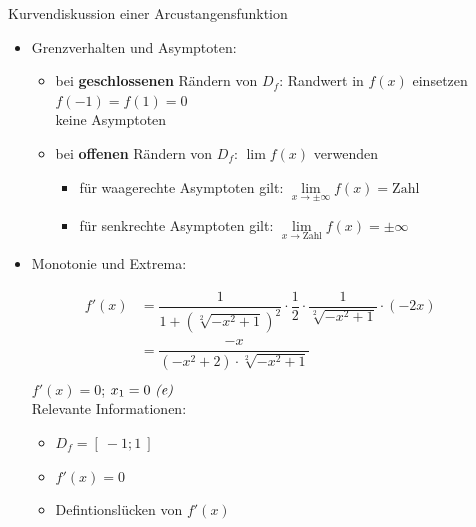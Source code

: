 \begin{Example}{Kurvendiskussion einer Arcustangensfunktion}{}
\begin{itemize}
{\begin{itemize}
{                $x_{1} = -1 \ \text{\textit{(e)}}; \quad x_{2} = 1 \ \text{\textit{(e)}}$
                }
        \end{itemize}
        }
    \item Grenzverhalten und Asymptoten: \\[-3.0ex]{
        \begin{itemize}
            \item bei \textbf{geschlossenen} Rändern von $D_{f}$: \quad Randwert in  $f(x)$ einsetzen \\[1.0ex]{
                $f(-1) = f(1) = 0$\\[1.0ex]
                keine Asymptoten
                }
            \item bei \textbf{offenen} Rändern von $D_{f}$: \quad $\lim\limits f(x)$ verwenden \\[-2.0ex]{
                \begin{itemize}
                    \item für waagerechte Asymptoten gilt: \quad $\lim\limits_{x \to \pm \infty} f(x) = \text{Zahl}$\\[-1.0ex]
                    \item für senkrechte Asymptoten gilt: \quad $\lim\limits_{x \to \text{Zahl}} f(x) = \pm \infty$
                \end{itemize}
                }
        \end{itemize}
        }
    \item Monotonie und Extrema: \\[-2.0ex]{
        \begin{align*}
            f'(x) &= \dfrac{1}{1 + \left(\sqrt[2]{- x^{2} + 1}\right)^{2}} \cdot \dfrac{1}{2} \cdot \dfrac{1}{\sqrt[2]{- x^{2} + 1}} \cdot \left(-2x\right) &&\\[1.5ex]
            &= \dfrac{-x}{\left(-x^{2} + 2\right) \cdot \sqrt[2]{- x^{2} + 1}} && \\[-2.0ex]
        \end{align*}
        $f'(x) = 0$; \qquad $x_{1} = 0 \ \text{\textit{(e)}}$\\[1.0ex]
        Relevante Informationen: \\[-3.0ex]{
        \begin{itemize}
            \item $D_{f} = \left[ \ -1; 1 \ \right]$
            \item $f'(x) = 0$
            \item Defintionslücken von $f'(x)$ \\[1.0ex]{
}
\end{itemize}}}
\end{itemize}
\end{Example}
